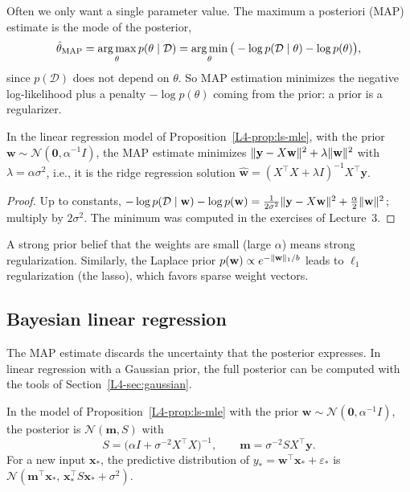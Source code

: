 Often we only want a single parameter value. The maximum a posteriori (MAP) estimate is the mode of the posterior,
\[\hat\theta_{\text{MAP}} = \operatorname*{arg\,max}_\theta p(\theta \mid \mathcal{D}) = \operatorname*{arg\,min}_\theta \big(-\log p(\mathcal{D} \mid \theta) - \log p(\theta)\big),\]
since $p(\mathcal{D})$ does not depend on $\theta$. So MAP estimation minimizes the negative log-likelihood plus a penalty $-\log p(\theta)$ coming from the prior: a prior is a regularizer.

\begin{proposition}\label{L4-prop:ridge-map}
    In the linear regression model of Proposition~\ref{L4-prop:ls-mle}, with the prior $\mathbf{w} \sim \mathcal{N}(\mathbf{0}, \alpha^{-1}I)$, the MAP estimate minimizes $\lVert \mathbf{y} - X\mathbf{w} \rVert^2 + \lambda\lVert \mathbf{w} \rVert^2$ with $\lambda = \alpha\sigma^2$, i.e., it is the ridge regression solution $\hat{\mathbf{w}} = (X^\top X + \lambda I)^{-1}X^\top\mathbf{y}$.
\end{proposition}

\begin{proof}
    Up to constants, $-\log p(\mathcal{D} \mid \mathbf{w}) - \log p(\mathbf{w}) = \frac{1}{2\sigma^2}\lVert \mathbf{y} - X\mathbf{w} \rVert^2 + \frac{\alpha}{2}\lVert \mathbf{w} \rVert^2$; multiply by $2\sigma^2$. The minimum was computed in the exercises of Lecture~3.
\end{proof}

A strong prior belief that the weights are small (large $\alpha$) means strong regularization. Similarly, the Laplace prior $p(\mathbf{w}) \propto e^{-\lVert \mathbf{w} \rVert_1/b}$ leads to $\ell_1$ regularization (the lasso), which favors sparse weight vectors.

\subsection{Bayesian linear regression}

The MAP estimate discards the uncertainty that the posterior expresses. In linear regression with a Gaussian prior, the full posterior can be computed with the tools of Section~\ref{L4-sec:gaussian}.

\begin{theorem}\label{L4-thm:blr}
    In the model of Proposition~\ref{L4-prop:ls-mle} with the prior $\mathbf{w} \sim \mathcal{N}(\mathbf{0}, \alpha^{-1}I)$, the posterior is $\mathcal{N}(\mathbf{m}, S)$ with
    \[S = \big(\alpha I + \sigma^{-2}X^\top X\big)^{-1}, \qquad \mathbf{m} = \sigma^{-2}SX^\top\mathbf{y}.\]
    For a new input $\mathbf{x}_*$, the predictive distribution of $y_* = \mathbf{w}^\top\mathbf{x}_* + \varepsilon_*$ is $\mathcal{N}(\mathbf{m}^\top\mathbf{x}_*, \, \mathbf{x}_*^\top S\mathbf{x}_* + \sigma^2)$.
\end{theorem}

